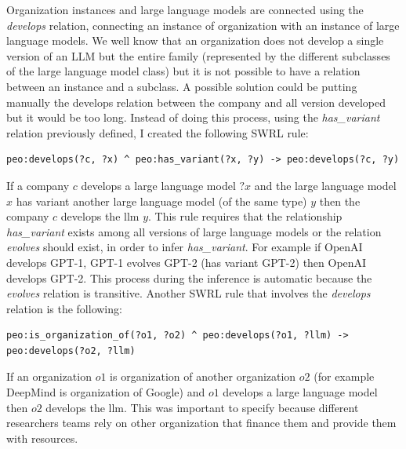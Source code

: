 Organization instances and large language models are connected using the \textit{develops} relation, connecting an instance of organization with an instance of large language models. We well know that an organization does not develop a single version of an LLM but the entire family (represented by the different subclasses of the large language model class) but it is not possible to have a relation between an instance and a subclass. A possible solution could be putting manually the develops relation between the company and all version developed but it would be too long. Instead of doing this process, using the \textit{has\_variant} relation previously defined, I created the following SWRL rule:
\begin{lstlisting}
peo:develops(?c, ?x) ^ peo:has_variant(?x, ?y) -> peo:develops(?c, ?y)    
\end{lstlisting}
If a company $c$ develops a large language model $?x$ and the large language model $x$ has variant another large language model (of the same type) $y$ then the company $c$ develops the llm $y$. This rule requires that the relationship \textit{has\_variant} exists among all versions of large language models or the relation \textit{evolves} should exist, in order to infer \textit{has\_variant}. For example if OpenAI develops GPT-1, GPT-1 evolves GPT-2 (has variant GPT-2) then OpenAI develops GPT-2. This process during the inference is automatic because the \textit{evolves} relation is transitive. Another SWRL rule that involves the \textit{develops} relation is the following:
\begin{lstlisting}
peo:is_organization_of(?o1, ?o2) ^ peo:develops(?o1, ?llm) -> peo:develops(?o2, ?llm)
\end{lstlisting}
If an organization $o1$ is organization of another organization $o2$ (for example DeepMind is organization of Google) and $o1$ develops a large language model then $o2$ develops the llm. This was important to specify because different researchers teams rely on other organization that finance them and provide them with resources.

